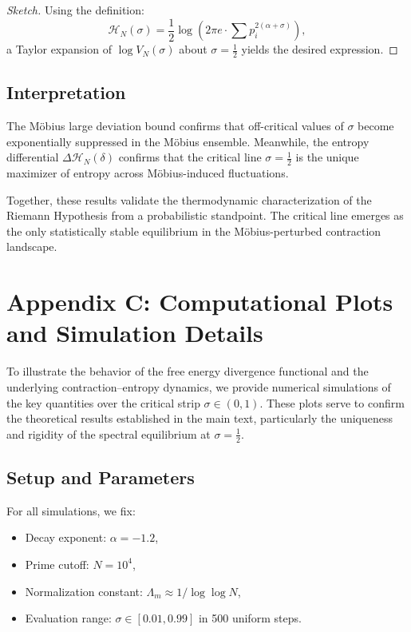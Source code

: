 \documentclass[12pt]{article}
\begin{document}
\begin{proof}[Sketch]
Using the definition:
\[
\mathcal{H}_N(\sigma) = \frac{1}{2} \log \left( 2\pi e \cdot \sum p_i^{2(\alpha + \sigma)} \right),
\]
a Taylor expansion of $\log V_N(\sigma)$ about $\sigma = \tfrac{1}{2}$ yields the desired expression.
\end{proof}

\subsection*{Interpretation}

The Möbius large deviation bound confirms that off-critical values of $\sigma$ become exponentially suppressed in the Möbius ensemble. Meanwhile, the entropy differential $\Delta \mathcal{H}_N(\delta)$ confirms that the critical line $\sigma = \tfrac{1}{2}$ is the unique maximizer of entropy across Möbius-induced fluctuations.

Together, these results validate the thermodynamic characterization of the Riemann Hypothesis from a probabilistic standpoint. The critical line emerges as the only statistically stable equilibrium in the Möbius-perturbed contraction landscape.

\section{Appendix C: Computational Plots and Simulation Details}

To illustrate the behavior of the free energy divergence functional and the underlying contraction–entropy dynamics, we provide numerical simulations of the key quantities over the critical strip $\sigma \in (0,1)$. These plots serve to confirm the theoretical results established in the main text, particularly the uniqueness and rigidity of the spectral equilibrium at $\sigma = \tfrac{1}{2}$.

\subsection*{Setup and Parameters}

For all simulations, we fix:
\begin{itemize}
    \item Decay exponent: $\alpha = -1.2$,
    \item Prime cutoff: $N = 10^4$,
    \item Normalization constant: $\Lambda_m \approx 1 / \log \log N$,
    \item Evaluation range: $\sigma \in [0.01, 0.99]$ in 500 uniform steps.
\end{itemize}
\end{document}
